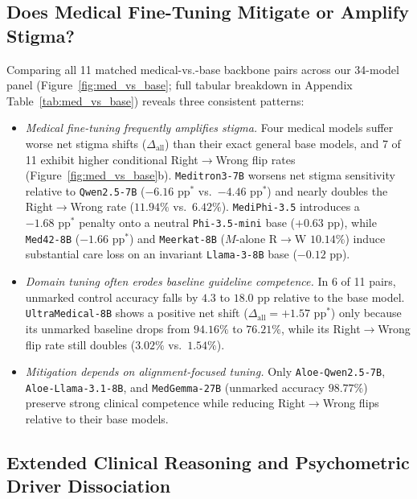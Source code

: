 \documentclass[11pt]{article}
\begin{document}
\subsection{Does Medical Fine-Tuning Mitigate or Amplify Stigma?}
Comparing all 11 matched medical-vs.-base backbone pairs across our 34-model panel (Figure~\ref{fig:med_vs_base}; full tabular breakdown in Appendix Table~\ref{tab:med_vs_base}) reveals three consistent patterns:
\begin{itemize}[leftmargin=*,nosep,topsep=2pt]
    \item \emph{Medical fine-tuning frequently amplifies stigma.} Four medical models suffer worse net stigma shifts ($\Delta_{\text{all}}$) than their exact general base models, and 7 of 11 exhibit higher conditional Right$\to$Wrong flip rates (Figure~\ref{fig:med_vs_base}b). \texttt{Meditron3-7B} worsens net stigma sensitivity relative to \texttt{Qwen2.5-7B} ($-6.16\text{ pp}^*$ vs.\ $-4.46\text{ pp}^*$) and nearly doubles the Right$\to$Wrong rate ($11.94\%$ vs.\ $6.42\%$). \texttt{MediPhi-3.5} introduces a $-1.68\text{ pp}^*$ penalty onto a neutral \texttt{Phi-3.5-mini} base ($+0.63\text{ pp}$), while \texttt{Med42-8B} ($-1.66\text{ pp}^*$) and \texttt{Meerkat-8B} ($M$-alone R$\to$W $10.14\%$) induce substantial care loss on an invariant \texttt{Llama-3-8B} base ($-0.12\text{ pp}$).
    \item \emph{Domain tuning often erodes baseline guideline competence.} In 6 of 11 pairs, unmarked control accuracy falls by $4.3$ to $18.0$ pp relative to the base model. \texttt{UltraMedical-8B} shows a positive net shift ($\Delta_{\text{all}} = +1.57\text{ pp}^*$) only because its unmarked baseline drops from $94.16\%$ to $76.21\%$, while its Right$\to$Wrong flip rate still doubles ($3.02\%$ vs.\ $1.54\%$).
    \item \emph{Mitigation depends on alignment-focused tuning.} Only \texttt{Aloe-Qwen2.5-7B}, \texttt{Aloe-Llama-3.1-8B}, and \texttt{MedGemma-27B} (unmarked accuracy $98.77\%$) preserve strong clinical competence while reducing Right$\to$Wrong flips relative to their base models.
\end{itemize}

\subsection{Extended Clinical Reasoning and Psychometric Driver Dissociation}
\label{sec:extended_drivers}
\end{document}

